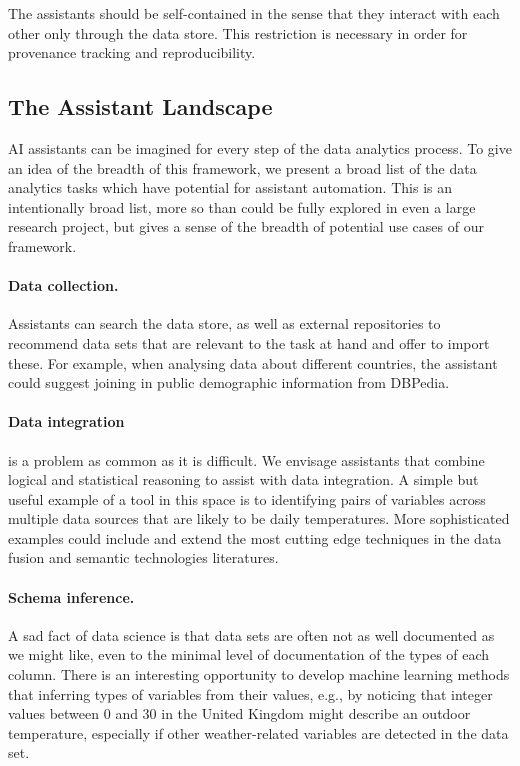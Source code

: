 \documentclass[sigplan,preprint,10pt]{acmart}\settopmatter{printfolios=true,printccs=false,printacmref=false}
\theoremstyle{plain}
\theoremstyle{definition}
\begin{document}
{\medskip \noindent
The assistants should be self-contained in the sense that they interact with each other
only through the
data store. This restriction is necessary in order
for provenance tracking and reproducibility.



\subsection{The Assistant Landscape}
{

AI assistants can be imagined for every step of the data analytics process.
To give an idea of the breadth of this framework,
we present a broad list of the data analytics tasks which have potential for assistant automation.
This is an intentionally broad list, more so than
could be fully explored in even a large research project, but gives a sense of the breadth of
potential use cases of our framework.

\paragraph{Data collection.} Assistants can search the data store, as well as external repositories
to recommend data sets that are relevant to the task at hand and offer to import these. For example,
when analysing data about different countries,
the assistant could suggest joining in public
demographic information from DBPedia.

\paragraph{Data integration} is a problem as common
as it is difficult. We envisage assistants
that combine logical and statistical reasoning to assist
with data  integration. A simple but useful
example of a tool in this space is to
 identifying pairs of variables across multiple data
sources that are likely to be daily temperatures.
More sophisticated examples could include and extend the
most cutting edge techniques in the data fusion and
semantic technologies literatures.

\paragraph{Schema inference.} A sad fact of data
science is that data sets are often not as well documented
as we might like, even to the minimal level of
documentation of the types of each column.
There is an interesting opportunity to
develop machine learning methods that inferring types of variables from their values, e.g.,
by noticing that integer values between 0 and 30 in
the United Kingdom might describe an outdoor temperature, especially if other weather-related
variables are detected in the data set.

}}
\end{document}
